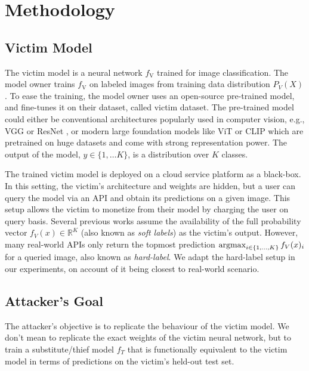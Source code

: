 
\section{Methodology}

\subsection{Victim Model} 
The victim model is a neural network $f_\textrm{V}$ trained for image classification. The model owner trains $f_\textrm{V}$ on labeled images from training data distribution $P_V(X)$. To ease the training, the model owner uses an open-source pre-trained model, and fine-tunes it on their dataset, called victim dataset. The pre-trained model could either be conventional architectures popularly used in computer vision, e.g., VGG \cite{simonyan2014very} or ResNet \cite{he2016deep}, or modern large foundation models like ViT \cite{dosovitskiy2020image} or CLIP \cite{radford2021learning} which are pretrained on huge datasets and come with strong representation power. The output of the model, $y \in \{1, \dots K\}$, is a distribution over $K$ classes. 

The trained victim model is deployed on a cloud service platform as a black-box. In this setting, the victim's architecture and weights are hidden, but a user can query the model via an API and obtain its predictions on a given image. This setup allows the victim to monetize from their model by charging the user on query basis. 
Several previous works assume the availability of the full probability vector $f_V(x) \in \mathbb{R}^K$ (also known as \emph{soft labels}) as the victim's output. However, many real-world APIs only return the topmost prediction $\operatorname*{argmax}_{i\in\{1, \dots, K\}} f_V(x)_i$ for a queried image, also known as \emph{hard-label}. We adapt the hard-label setup in our experiments, on account of it being closest to real-world scenario.

\subsection{Attacker's Goal} 
The attacker's objective is to replicate the behaviour of the victim model. We don't mean to replicate the exact weights of the victim neural network, but to train a substitute/thief model $f_{T}$ that is functionally equivalent to the victim model in terms of predictions on the victim's held-out test set. 


